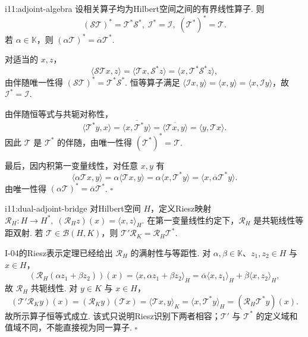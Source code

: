 \begin{FAProposition}[B][Hilbert伴随代数]{i11:adjoint-algebra}
设相关算子均为Hilbert空间之间的有界线性算子. 则
\[
(\mathcal S\mathcal T)^*=\mathcal T^*\mathcal S^*, \; \mathcal I^*=\mathcal I, \; (\mathcal T^*)^*=\mathcal T.
\]
若 \(\displaystyle \alpha\in\mathbb K\)，则
\(\displaystyle (\alpha\mathcal T)^*=\overline\alpha\mathcal T^*\).
\end{FAProposition}

\begin{FAProof}
对适当的 \(\displaystyle x,z\)，
\[
\langle\mathcal S\mathcal T x,z\rangle
=\langle\mathcal T x,\mathcal S^*z\rangle
=\langle x,\mathcal T^*\mathcal S^*z\rangle,
\]
由伴随唯一性得 \(\displaystyle (\mathcal S\mathcal T)^*=\mathcal T^*\mathcal S^*\). 恒等算子满足 \(\displaystyle \langle\mathcal Ix,y\rangle=\langle x,y\rangle=\langle x,\mathcal Iy\rangle\)，故 \(\displaystyle \mathcal I^*=\mathcal I\).

由伴随恒等式与共轭对称性，
\[
\langle\mathcal T^*y,x\rangle
=\overline{\langle x,\mathcal T^*y\rangle}
=\overline{\langle\mathcal T x,y\rangle}
=\langle y,\mathcal T x\rangle.
\]
因此 \(\displaystyle \mathcal T\) 是 \(\displaystyle \mathcal T^*\) 的伴随，由唯一性得 \(\displaystyle (\mathcal T^*)^*=\mathcal T\).

最后，因内积第一变量线性，对任意 \(\displaystyle x,y\) 有
\[
\langle\alpha\mathcal T x,y\rangle
=\alpha\langle\mathcal T x,y\rangle
=\alpha\langle x,\mathcal T^*y\rangle
=\langle x,\overline\alpha\mathcal T^*y\rangle.
\]
由唯一性得 \(\displaystyle (\alpha\mathcal T)^*=\overline\alpha\mathcal T^*\).
\hfill\(\square\)
\end{FAProof}

\begin{FAProposition}[B][Banach对偶与Hilbert伴随的Riesz桥梁]{i11:dual-adjoint-bridge}
对Hilbert空间 \(\displaystyle H\)，定义Riesz映射
\(\displaystyle \mathcal R_H:H\to H^*, \; (\mathcal R_Hz)(x)=\langle x,z\rangle_H\).
在第一变量线性约定下，\(\displaystyle \mathcal R_H\) 是共轭线性等距双射. 若 \(\displaystyle \mathcal T\in\mathcal B(H,K)\)，则
\(\displaystyle \mathcal T'\mathcal R_K = \mathcal R_H\mathcal T^*\).
\end{FAProposition}

\begin{FAProof}
I-04的Riesz表示定理已经给出 \(\displaystyle \mathcal R_H\) 的满射性与等距性. 对 \(\displaystyle \alpha,\beta\in\mathbb K\)、\(\displaystyle z_1,z_2\in H\) 与 \(\displaystyle x\in H\)，
\[
(\mathcal R_H(\alpha z_1+\beta z_2))(x) =\langle x,\alpha z_1+\beta z_2\rangle_H =\overline\alpha\langle x,z_1\rangle_H+\overline\beta\langle x,z_2\rangle_H,
\]
故 \(\displaystyle \mathcal R_H\) 共轭线性. 对 \(\displaystyle y\in K\) 与 \(\displaystyle x\in H\)，
\[
(\mathcal T'\mathcal R_Ky)(x)
=(\mathcal R_Ky)(\mathcal T x)
=\langle\mathcal T x,y\rangle_K
=\langle x,\mathcal T^*y\rangle_H
=(\mathcal R_H\mathcal T^*y)(x).
\]
故所示算子恒等式成立. 该式只说明Riesz识别下两者相容；\(\displaystyle \mathcal T'\) 与 \(\displaystyle \mathcal T^*\) 的定义域和值域不同，不能直接视为同一算子.
\hfill\(\square\)
\end{FAProof}

